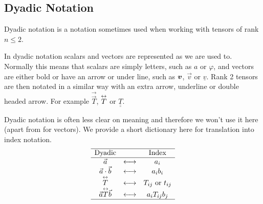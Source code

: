 \subsection{Dyadic Notation}
Dyadic notation is a notation sometimes used when working with tensors of rank \(n \le 2\).
\begin{notation*}{}
    In dyadic notation scalars and vectors are represented as we are used to.
    Normally this means that scalars are simply letters, such as \(a\) or \(\varphi\), and vectors are either bold or have an arrow or under line, such as \(\bm{v}\), \(\vec{v}\) or \(\underline{v}\).
    Rank 2 tensors are then notated in a similar way with an extra arrow, underline or double headed arrow.
    For example \(\vec{\vec{T}}\), \(\overset{\tiny\leftrightarrow}{T}\) or \(\underline{\underline{T}}\).
\end{notation*}
Dyadic notation is often less clear on meaning and therefore we won't use it here (apart from for vectors).
We provide a short dictionary here for translation into index notation.
\[
\begin{array}{ccc}\hline
    \text{Dyadic} &  & \text{Index}\\\hline
    \vec{a} & \longleftrightarrow & a_i\\
    \vec{a} \cdot \vec{b} & \longleftrightarrow & a_ib_i\\
    \overset{\tiny\leftrightarrow}{T} & \longleftrightarrow & T_{ij}~\text{or}~t_{ij}\\
    \vec{a}\overset{\tiny\leftrightarrow}{T}\vec{b} & \longleftrightarrow & a_iT_{ij}b_j\\\hline
\end{array}
\]

